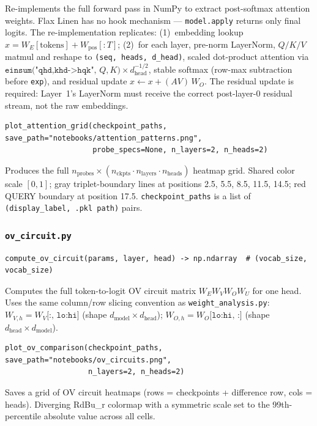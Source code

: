 \documentclass[11pt, a4paper]{article}
\begin{document}
Re-implements the full forward pass in NumPy to extract post-softmax attention
weights. Flax Linen has no hook mechanism --- \texttt{model.apply} returns only
final logits. The re-implementation replicates: (1)~embedding lookup
$x = W_E[\text{tokens}] + W_{\text{pos}}[:T]$; (2)~for each layer, pre-norm
LayerNorm, $Q/K/V$ matmul and reshape to \texttt{(seq, heads, d\_head)}, scaled
dot-product attention via
$\texttt{einsum("qhd,khd->hqk", }Q, K\texttt{)} \times d_{\text{head}}^{-1/2}$,
stable softmax (row-max subtraction before \texttt{exp}), and residual update
$x \leftarrow x + (AV)\,W_O$. The residual update is required: Layer~1's
LayerNorm must receive the correct post-layer-0 residual stream, not the raw
embeddings.

\begin{lstlisting}
plot_attention_grid(checkpoint_paths, save_path="notebooks/attention_patterns.png",
                    probe_specs=None, n_layers=2, n_heads=2)
\end{lstlisting}

Produces the full $n_{\text{probes}} \times (n_{\text{ckpts}} \cdot n_{\text{layers}} \cdot n_{\text{heads}})$
heatmap grid. Shared color scale $[0, 1]$; gray triplet-boundary lines at
positions 2.5, 5.5, 8.5, 11.5, 14.5; red QUERY boundary at position 17.5.
\texttt{checkpoint\_paths} is a list of \texttt{(display\_label, .pkl~path)} pairs.

\subsubsection{\texttt{ov\_circuit.py}}

\begin{lstlisting}
compute_ov_circuit(params, layer, head) -> np.ndarray  # (vocab_size, vocab_size)
\end{lstlisting}

Computes the full token-to-logit OV circuit matrix $W_E W_V W_O W_U$ for one
head.  Uses the same column/row slicing convention as \texttt{weight\_analysis.py}:
$W_{V,h} = W_V\texttt{[:, lo:hi]}$ (shape $d_{\text{model}} \times d_{\text{head}}$);
$W_{O,h} = W_O\texttt{[lo:hi, :]}$ (shape $d_{\text{head}} \times d_{\text{model}}$).

\begin{lstlisting}
plot_ov_comparison(checkpoint_paths, save_path="notebooks/ov_circuits.png",
                   n_layers=2, n_heads=2)
\end{lstlisting}

Saves a grid of OV circuit heatmaps (rows = checkpoints + difference row,
cols = heads).  Diverging RdBu\_r colormap with a symmetric scale set to the
99th-percentile absolute value across all cells.
\end{document}
